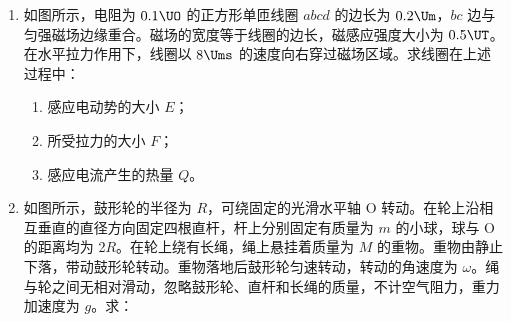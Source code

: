 \documentclass[\gkver]{gaokaozhenti}
\begin{document}
\begin{enumerate}
{（2）光纤通信利用了光的全反射现象，光由光密介质射入光疏介质时才会发生全反射，所以光纤内芯的折射率比外套的大；该内芯的折射率为 $n=\frac{1}{\sin C}=\frac{1}{\sin43^{\circ}}=\frac{1}{0.68}\approx1.5$。

（3）电磁波在月壤中的传播速度 $v=f\lambda$，由题意得 $2d=v\Delta t$，解得 $d=\frac{f\lambda\Delta t}{2}$。
}

\item
如图所示，电阻为 $0.1\UO$ 的正方形单匝线圈 $abcd$ 的边长为 $0.2\Um$，$bc$ 边与匀强磁场边缘重合。磁场的宽度等于线圈的边长，磁感应强度大小为 $0.5\UT$。在水平拉力作用下，线圈以 $8\Ums$ 的速度向右穿过磁场区域。求线圈在上述过程中：

\begin{enumerate}
\item
感应电动势的大小 $E$；
\item
所受拉力的大小 $F$；
\item
感应电流产生的热量 $Q$。
\end{enumerate}

\onepicture[w=5.20cm, align=right]{}

\jdanswer{
\begin{enumerate}
\item
$0.8\UV$
\item
$0.8\UN$
\item
$0.32\UJ$
\end{enumerate}
}


\item
如图所示，鼓形轮的半径为 $R$，可绕固定的光滑水平轴 O 转动。在轮上沿相互垂直的直径方向固定四根直杆，杆上分别固定有质量为 $m$ 的小球，球与 O 的距离均为 2$R$。在轮上绕有长绳，绳上悬挂着质量为 $M$ 的重物。重物由静止下落，带动鼓形轮转动。重物落地后鼓形轮匀速转动，转动的角速度为 $\omega$。绳与轮之间无相对滑动，忽略鼓形轮、直杆和长绳的质量，不计空气阻力，重力加速度为 $g$。求：


\end{enumerate}
\end{document}
